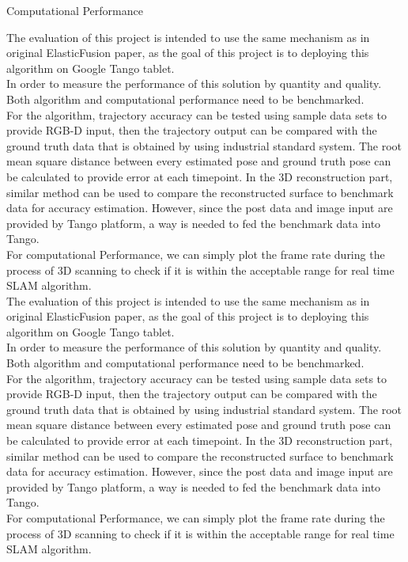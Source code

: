 \documentclass[12pt,twoside]{article}
\begin{document}
Computational Performance


​The evaluation of this project is intended to use the same mechanism as in original ElasticFusion\citep{whelan2016elasticfusion} paper, as the goal of this project is to deploying this algorithm on Google Tango tablet.\\
In order to measure the performance of this solution by quantity and quality. Both algorithm and computational performance need to be benchmarked.\\
For the algorithm, trajectory accuracy can be tested using sample data sets to provide RGB-D input, then the trajectory output can be compared with the ground truth data that is obtained by using industrial standard system. The root mean square distance between every estimated pose and ground truth pose can be calculated to provide error at each timepoint. In the 3D reconstruction part, similar method can be used to compare the reconstructed surface to benchmark data for accuracy estimation. However, since the post data and image input are provided by Tango platform, a way is needed to fed the benchmark data into Tango.\\
For computational Performance, we can simply plot the frame rate during the process of 3D scanning to check if it is within the acceptable range for real time SLAM algorithm.\\
​The evaluation of this project is intended to use the same mechanism as in original ElasticFusion\citep{whelan2016elasticfusion} paper, as the goal of this project is to deploying this algorithm on Google Tango tablet.\\
In order to measure the performance of this solution by quantity and quality. Both algorithm and computational performance need to be benchmarked.\\
For the algorithm, trajectory accuracy can be tested using sample data sets to provide RGB-D input, then the trajectory output can be compared with the ground truth data that is obtained by using industrial standard system. The root mean square distance between every estimated pose and ground truth pose can be calculated to provide error at each timepoint. In the 3D reconstruction part, similar method can be used to compare the reconstructed surface to benchmark data for accuracy estimation. However, since the post data and image input are provided by Tango platform, a way is needed to fed the benchmark data into Tango.\\
For computational Performance, we can simply plot the frame rate during the process of 3D scanning to check if it is within the acceptable range for real time SLAM algorithm.
\end{document}
